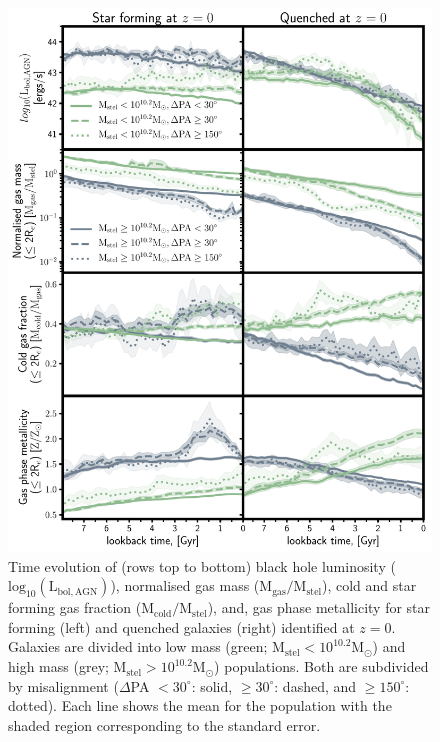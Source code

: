 \begin{figure}
	\includegraphics[width=\linewidth]{misalignment_BH/time_evo_letter_without_BH_props.pdf}
    \caption{Time evolution of (rows top to bottom) black hole luminosity ($\mathrm{log_{10}(L_{bol, AGN})}$), normalised gas mass ($\mathrm{M_{gas}/M_{stel}}$), cold and star forming gas fraction ($\mathrm{M_{cold}/M_{stel}}$), and, gas phase metallicity for star forming (left) and quenched galaxies (right) identified at $z=0$. Galaxies are divided into low mass (green; $\mathrm{M_{stel} < 10^{10.2}M_{\odot}}$) and high mass (grey; $\mathrm{M_{stel} > 10^{10.2}M_{\odot}}$) populations. Both are subdivided by misalignment ($\Delta$PA $< 30^{\circ}$: solid, $\geq 30^{\circ}$: dashed, and  $\geq 150^{\circ}$: dotted). Each line shows the mean for the population with the shaded region corresponding to the standard error.}
    \label{fig:overall_pop}
\end{figure}

